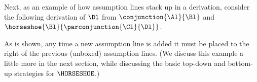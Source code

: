 Next, as an example of how assumption lines stack up in a derivation, consider the following derivation of $\Dl$ from $\conjunction{\Al}{\Bl}$ and $\horseshoe{\Bl}{\parconjunction{\Cl}{\Dl}}$.
\begin{gproof}[\label{secondexample}]
\end{gproof}
\noindent{}As is shown, any time a new assumption line is added it must be placed to the right of the previous (unboxed) assumption lines. (We discuss this example a little more in the next section, while discussing the basic top-down and bottom-up strategies for $\HORSESHOE$.)

